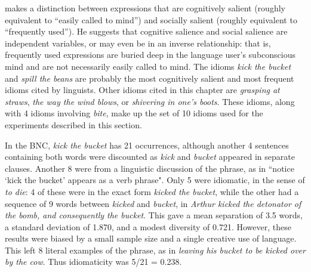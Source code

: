 \documentclass[output=paper]{langsci/langscibook}
\begin{document}
\cite[5,21,214]{hanks2013}  makes a distinction between expressions that
are cognitively salient (roughly equivalent to “easily called to mind”)
and socially salient (roughly equivalent to “frequently used”). He
suggests that cognitive salience and social salience are independent
variables, or may even be in an inverse relationship: that is,
frequently used expressions are buried deep in the language user’s
subconscious mind and are not necessarily easily called to mind. The
idioms \textit{kick the bucket} and \textit{spill the beans} are probably the most
cognitively salient and most frequent idioms cited by linguists. Other
idioms cited in this chapter are \textit{grasping at straws}, \textit{the way the
wind blows}, or \textit{shivering in one's boots}. These idioms, along with 4
idioms involving \textit{bite}, make up the set of 10 idioms used for the
experiments described in this section.



In the BNC, \textit{kick the bucket} has 21 occurrences, although another 4
sentences containing both words were discounted as \textit{kick} and \textit{bucket}
appeared in separate clauses. Another 8 were from a linguistic
discussion of the phrase, as in ``notice `kick the bucket' appears as a
verb phrase". Only 5 were idiomatic, in the sense of \textit{to die}: 4 of
these were in the exact form  \textit{kicked the bucket}, while the other had a
sequence of 9 words between \textit{kicked} and \textit{bucket}, in \textit{Arthur kicked
the detonator of the bomb, and consequently the bucket}. This gave a
mean separation of 3.5 words, a standard deviation of 1.870, and a
modest diversity of 0.721. However, these results were biased by a
small sample size and a single creative use of language. This left 8
literal examples of the phrase, as in  \textit{leaving his bucket to be kicked
over by the cow}. Thus idiomaticity was 5/21 = 0.238.
\end{document}
